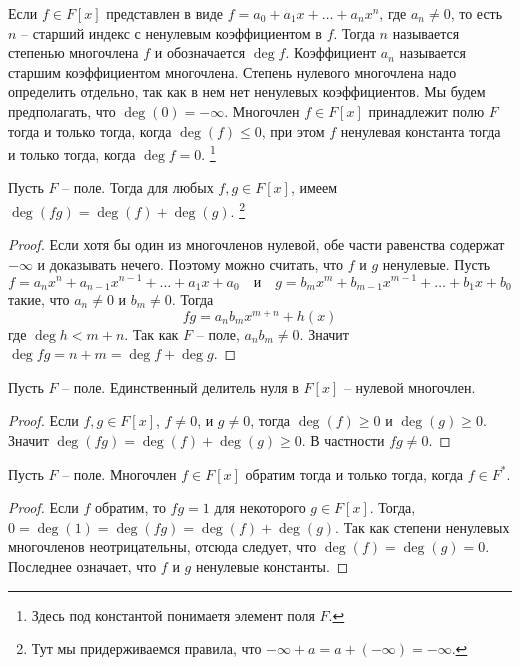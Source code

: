 Если $f\in F[x]$ представлен в виде $f = a_0 + a_1 x + \ldots + a_n x^n$, где $a_n \neq 0$, то есть $n$ -- старший индекс с ненулевым коэффициентом в $f$.
Тогда $n$ называется степенью многочлена $f$ и обозначается $\deg f$.
Коэффициент $a_n$ называется старшим коэффициентом многочлена.
Степень нулевого многочлена надо определить отдельно, так как в нем нет ненулевых коэффициентов.
Мы будем предполагать, что $\deg (0) = -\infty$.
Многочлен $f\in F[x]$ принадлежит полю $F$ тогда и только тогда, когда $\deg (f) \leqslant 0$, при этом $f$ ненулевая константа тогда и только тогда, когда $\deg f = 0$.%
\footnote{Здесь под константой понимаетя элемент поля $F$.}

\begin{claim}
\label{claim::Degree}
Пусть $F$ -- поле.
Тогда для любых $f, g \in F[x]$, имеем $\deg(fg) = \deg (f) + \deg(g)$.%
\footnote{Тут мы придерживаемся правила, что $-\infty + a = a + (-\infty) = -\infty$.}
\end{claim}
\begin{proof}
Если хотя бы один из многочленов нулевой, обе части равенства содержат $-\infty$ и доказывать нечего.
Поэтому можно считать, что $f$ и  $g$ ненулевые.
Пусть 
\[
f = a_n x^n + a_{n-1}x^{n-1} + \ldots + a_1 x + a_0\quad \text{и} \quad g = b_mx^m + b_{m-1}x^{m-1} + \ldots + b_1 x + b_0
\]
такие, что $a_n\neq 0$ и $b_m\neq0$.
Тогда
\[
fg = a_n b_m x^{m+n} + h(x)
\]
где $\deg h < m + n$.
Так как $F$ -- поле, $a_n b_m \neq 0$.
Значит $\deg fg = n + m = \deg f + \deg g$.
\end{proof}

\begin{claim}
\label{claim::PolyZeroDiv}
Пусть $F$ -- поле.
Единственный делитель нуля в $F[x]$ -- нулевой многочлен.
\end{claim}
\begin{proof}
Если $f, g\in F[x]$, $f\neq 0$, и $g\neq 0$, тогда $\deg(f) \geqslant 0$ и $\deg(g) \geqslant 0$.
Значит $\deg(fg) = \deg(f) + \deg(g)\geqslant 0$.
В частности $fg \neq 0$.
\end{proof}

\begin{claim}
\label{claim::PolyInvert}
Пусть $F$ -- поле.
Многочлен $f\in F[x]$ обратим тогда и только тогда, когда $f\in F^*$.
\end{claim}
\begin{proof}
Если $f$ обратим, то $fg = 1$ для некоторого $g\in F[x]$.
Тогда, $0 = \deg(1) = \deg(fg) = \deg(f) + \deg(g)$.
Так как степени ненулевых многочленов неотрицательны, отсюда следует, что $\deg(f) = \deg(g) = 0$.
Последнее означает, что $f$ и $g$ ненулевые константы.
\end{proof}


